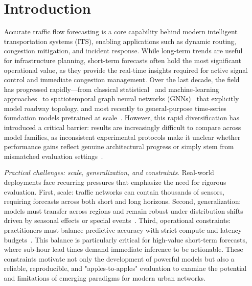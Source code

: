 \documentclass[10pt]{article}
\begin{document}
\section{Introduction}
\label{sec:introduction}

Accurate traffic flow forecasting is a core capability behind modern intelligent transportation systems (ITS), enabling applications such as dynamic routing, congestion mitigation, and incident response. While long-term trends are useful for infrastructure planning, short-term forecasts often hold the most significant operational value, as they provide the real-time insights required for active signal control and immediate congestion management\citep{cao2020spectral, liu2023largest}. Over the last decade, the field has progressed rapidly---from classical statistical~\citep{AhmedCook1979BoxJenkins, karlaftis2011statistical} and machine-learning approaches~\citep{WilliamsHoel2003SeasonalARIMA, smith2002comparison} to spatiotemporal graph neural networks (GNNs)~\citep{10.1145/3783987, li2021spatial, choi2022graph, lan2022dstagnn} that explicitly model roadway topology, and most recently to general-purpose time-series foundation models pretrained at scale~\citep{ansari2024chronos, woo2024moirai, cao2024tempo}. However, this rapid diversification has introduced a critical barrier: results are increasingly difficult to compare across model families, as inconsistent experimental protocols make it unclear whether performance gains reflect genuine architectural progress or simply stem from mismatched evaluation settings~\citep{liu2023needgnn, manibardo2021deep, zeng2023transformers}.

\textit{Practical challenges: scale, generalization, and constraints.}
Real-world deployments face recurring pressures that emphasize the need for rigorous evaluation. First, {scale}: traffic networks can contain thousands of sensors, requiring forecasts across both short and long horizons\citep{liu2023largest, fhwa_pems}. Second, {generalization}: models must transfer across regions and remain robust under distribution shifts driven by seasonal effects or special events~\citep{cools2007holidays, SHAO2025105152}. Third, {operational constraints}: practitioners must balance predictive accuracy with strict compute and latency budgets~\citep{vlahogianni2014shortterm}. This balance is particularly critical for high-value short-term forecasts, where sub-hour lead times demand immediate inference to be actionable. These constraints motivate not only the development of powerful models but also a reliable, reproducible, and "apples-to-apples" evaluation to examine the potential and limitations of emerging paradigms for modern urban networks.
\end{document}
